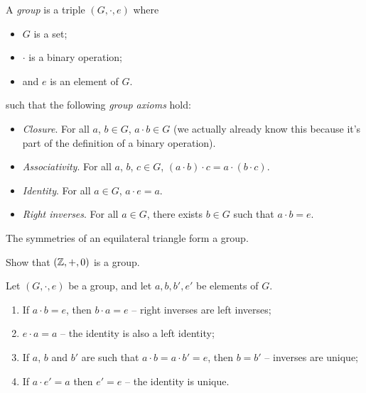 \documentclass{../../template/note}
\begin{document}
    \begin{definition}
        A \emph{group} is a triple \((G, \cdot, e)\) where
        \begin{itemize}
            \item \(G\) is a set;
            \item \(\cdot\) is a binary operation;
            \item and \(e\) is an element of \(G\).
        \end{itemize}
        such that the following \emph{group axioms} hold:
        \begin{itemize}
            \item \emph{Closure}. For all \(a\), \(b \in G\), \(a \cdot b \in G\) (we actually already know this because it's part of the definition of a binary operation).
            \item \emph{Associativity}. For all \(a\), \(b\), \(c \in G\), \((a \cdot b) \cdot c = a \cdot (b \cdot c)\).
            \item \emph{Identity}. For all \(a \in G\), \(a \cdot e = a\).
            \item \emph{Right inverses}. For all \(a \in G\), there exists \(b \in G\) such that \(a \cdot b = e\). 
        \end{itemize}        
    \end{definition}
    
    \begin{example*}
        The symmetries of an equilateral triangle form a group.
    \end{example*}
    
    \begin{exercise}
        Show that \((\mathbb Z, +, 0)\) is a group.
    \end{exercise}


    \begin{proposition}
        Let \((G, \cdot, e)\) be a group, and let \(a, b, b', e'\) be elements of \(G\).
        \begin{enumerate}
            \item If \(a \cdot b = e\), then \(b \cdot a = e\) -- right inverses are left inverses;
            \item \(e \cdot a = a\) -- the identity is also a left identity;
            \item If \(a\), \(b\) and \(b'\) are such that \(a \cdot b = a \cdot b' = e\), then \(b = b'\) -- inverses are unique;
            \item If \(a \cdot e' = a\) then \(e' = e\) -- the identity is unique.
        \end{enumerate}
        
        
    \end{proposition}
\end{document}
